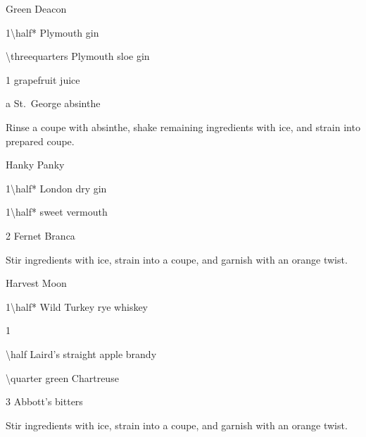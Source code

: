 \begin{Cocktail}[\PDT]{Green Deacon}
  \begin{Ingredients}
  \item \SI{1\half*}{\oz} Plymouth gin
  \item \SI{\threequarters}{\oz} Plymouth sloe gin
  \item \SI{1}{\oz} grapefruit juice
  \item a \si{\dash} St.\ George absinthe
  \end{Ingredients}
  
  \begin{Instructions}
	Rinse a coupe with absinthe, shake remaining ingredients with ice, and strain into prepared coupe.
  \end{Instructions}
\end{Cocktail}

\begin{Cocktail}[\Savoy]{Hanky Panky}
  \begin{Ingredients}
  \item \SI{1\half*}{\oz} London dry gin
  \item \SI{1\half*}{\oz} sweet vermouth
  \item 2 \si{\dashes} Fernet Branca
  \end{Ingredients}
  
  \begin{Instructions}
	Stir ingredients with ice, strain into a coupe, and garnish with an orange twist.
  \end{Instructions}
\end{Cocktail}

\begin{Cocktail}[\PDT]{Harvest Moon}
  \begin{Ingredients}
  \item \SI{1\half*}{\oz} Wild Turkey rye whiskey
  \item \SI{1}{\oz} \Lillet
  \item \SI{\half}{\oz} Laird's straight apple brandy
  \item \SI{\quarter}{\oz} green Chartreuse
  \item 3 \si{\dashes} Abbott's bitters
  \end{Ingredients}
  
  \begin{Instructions}
	Stir ingredients with ice, strain into a coupe, and garnish with an orange twist.
  \end{Instructions}
\end{Cocktail}

